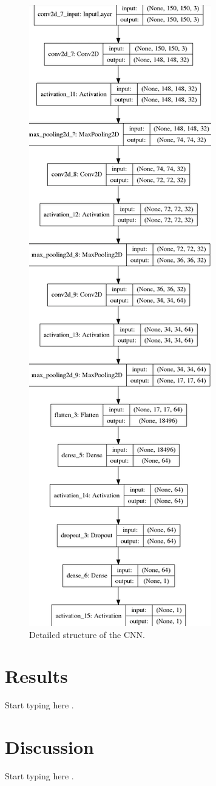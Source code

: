 \documentclass[conference]{IEEEtran}
\begin{document}
\begin{figure}[htbp]
\centerline{\includegraphics[scale=1]{./model_plt.png}}
\caption{Detailed structure of the CNN.}
\label{fig}
\end{figure}

\section{Results}

Start typing here \cite{b4}.

\section{Discussion}

Start typing here \cite{b5}.


\end{document}
